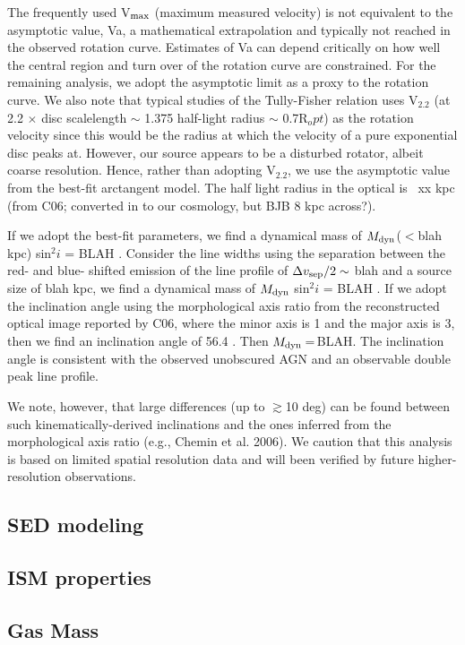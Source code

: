 \documentclass[]{emulateapj}
\begin{document}
The frequently used V$_{\rm max}$ (maximum measured velocity) is not equivalent to the
asymptotic value, Va, a mathematical extrapolation and typically not reached in
the observed rotation curve. Estimates of Va can depend critically on how well
the central region and turn over of the rotation curve are constrained. For the
remaining analysis, we adopt the asymptotic limit as a proxy to the rotation
curve. We also note that typical studies of the Tully-Fisher relation uses V$_2.2$ (at 2.2 $\times$ disc scalelength $\sim$ 1.375 half-light radius $\sim$ 0.7R$_opt$) as the rotation
velocity since this would be the radius at which the velocity of a pure
exponential disc peaks at. However, our source appears to be a disturbed
rotator, albeit coarse resolution. Hence, rather than adopting V$_2.2$, we use the
asymptotic value from the best-fit arctangent model. The half light radius in the
optical is ~xx kpc (from C06; converted in to our cosmology, but BJB 8 kpc
across?).

If we adopt the best-fit parameters, we find a dynamical mass of $M_{\rm dyn}$($<$blah kpc) sin$^2 i$ = BLAH \Msun. Consider the line widths using the separation between
the red- and blue- shifted emission of the \bco line profile of $\Delta v_{\rm sep}/2 \sim$ blah \kms and a source size of blah kpc, we find a dynamical mass of $M_{\rm dyn}$
sin$^2 i$ = BLAH \Msun. If we adopt the inclination angle using the morphological axis ratio from the
reconstructed optical image reported by C06, where the minor axis is 1 and the major axis is 3, then we find an inclination angle of 56.4
\degr. Then $M_{\rm dyn}$\,=\,BLAH. The inclination angle is consistent with the observed unobscured AGN and an observable double peak line profile.

We note, however, that large differences (up to $\gtrsim$10 deg) can be found between such kinematically-derived inclinations and the ones inferred from the morphological
axis ratio (e.g., Chemin et al. 2006). We caution that this analysis is based on limited spatial resolution data and will been verified by future higher-resolution observations.

\subsection{SED modeling}
\subsection{ISM properties}
\subsection{Gas Mass}
\end{document}

